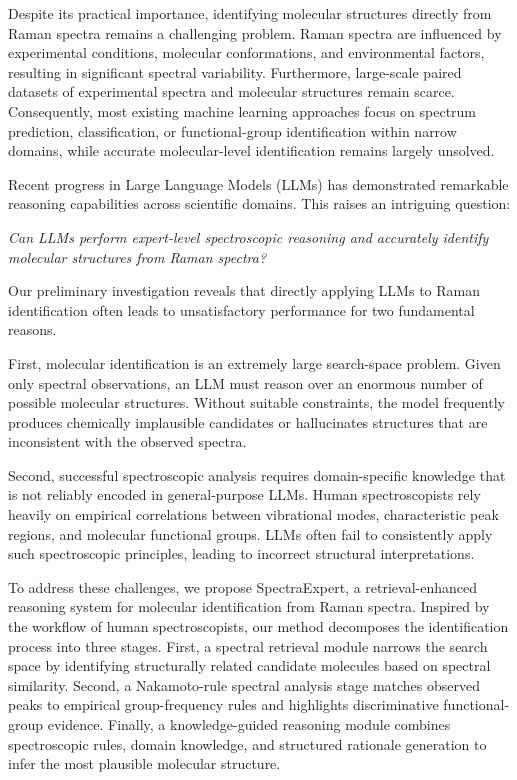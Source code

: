 \documentclass[conference]{IEEEtran}
\begin{document}
Despite its practical importance, identifying molecular structures directly from Raman spectra remains a challenging problem. Raman spectra are influenced by experimental conditions, molecular conformations, and environmental factors, resulting in significant spectral variability. Furthermore, large-scale paired datasets of experimental spectra and molecular structures remain scarce. Consequently, most existing machine learning approaches focus on spectrum prediction, classification, or functional-group identification within narrow domains\cite{zou2023deep,hu2023machine}, while accurate molecular-level identification remains largely unsolved.

Recent progress in Large Language Models (LLMs) has demonstrated remarkable reasoning capabilities across scientific domains. This raises an intriguing question:

\textit{Can LLMs perform expert-level spectroscopic reasoning and accurately identify molecular structures from Raman spectra?}

Our preliminary investigation reveals that directly applying LLMs to Raman identification often leads to unsatisfactory performance for two fundamental reasons.

First, molecular identification is an extremely large search-space problem. Given only spectral observations, an LLM must reason over an enormous number of possible molecular structures. Without suitable constraints, the model frequently produces chemically implausible candidates or hallucinates structures that are inconsistent with the observed spectra.

Second, successful spectroscopic analysis requires domain-specific knowledge that is not reliably encoded in general-purpose LLMs. Human spectroscopists rely heavily on empirical correlations between vibrational modes, characteristic peak regions, and molecular functional groups. LLMs often fail to consistently apply such spectroscopic principles, leading to incorrect structural interpretations.

To address these challenges, we propose SpectraExpert, a retrieval-enhanced reasoning system for molecular identification from Raman spectra. Inspired by the workflow of human spectroscopists, our method decomposes the identification process into three stages. First, a spectral retrieval module narrows the search space by identifying structurally related candidate molecules based on spectral similarity. Second, a Nakamoto-rule spectral analysis stage matches observed peaks to empirical group-frequency rules and highlights discriminative functional-group evidence. Finally, a knowledge-guided reasoning module combines spectroscopic rules, domain knowledge, and structured rationale generation to infer the most plausible molecular structure.
\end{document}
